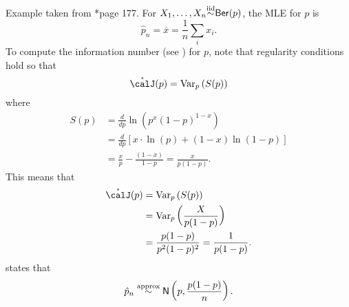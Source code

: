 \begin{exam} \label{exam: asym_dist_ber}
    Example taken from \cite{KroeseDirkP2013SMaC}*{page 177}. For $X_1 , \ldots , X_n {\overset{\text{iid}}{\sim}} {\sf Ber} (p)$, the MLE for $p$ is
    \begin{equation*}
        \hat{p}_n = \overline{x} = \frac{1}{n} \sum_i x_i .
    \end{equation*}
    To compute the information number (see ) for $p$, note that regularity conditions hold so that
    \begin{equation*}
        \mathring{\calJ} (p) = \Var_{p} \left( S (p) \right)
    \end{equation*}
    where
    \begin{align*}
        S (p) & = \frac{d}{dp} \ln \left( p^x (1-p)^{1-x} \right)               \\
              & = \frac{d}{dp} \left[ x \cdot \ln (p) + (1-x) \ln (1-p) \right] \\
              & = \frac{x}{p} - \frac{(1-x)}{1-p} = \frac{x}{p(1-p)}.
    \end{align*}
    This means that
    \begin{align*}
        \mathring{\calJ} (p) & = \Var_{p} \left( S (p) \right)                  \\
                             & = \Var_p \left( \frac{X}{p(1-p)} \right)         \\
                             & = \frac{p(1-p)}{p^2 (1-p)^2} = \frac{1}{p(1-p)}.
    \end{align*}
     states that
    \begin{equation*}
        \hat{p}_n \overset{\text{approx}}{\sim} {\sf N} \left( p , \frac{p(1-p)}{n} \right) .
    \end{equation*}
\end{exam}